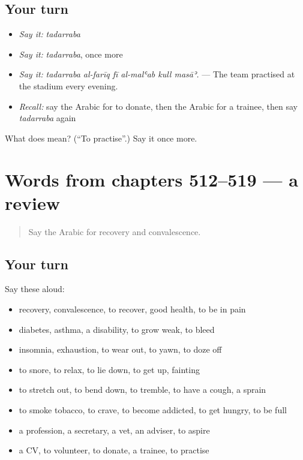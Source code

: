 \subsection*{Your turn}
\begin{itemize}
\raggedright
  \item \emph{Say it:} \emph{tadarraba}
  \item \emph{Say it:} \emph{tadarraba}, once more
  \item \emph{Say it:} \emph{tadarraba al-farīq fī al-malʿab kull masāʾ.} — The team practised at the stadium every evening.
  \item \emph{Recall:} say the Arabic for to donate, then the Arabic for a trainee, then say \emph{tadarraba} again
\end{itemize}

\begin{tcolorbox}[breakable,colback=teal!4,colframe=teal!35!black,title={Before you move on}]
What does  mean? (\textquotedblleft{}To practise\textquotedblright{}.) Say it once more.
\end{tcolorbox}
\section[(dialogue)]{Words from chapters 512–519 — a review}

\label{lesson:AR-R519-review-512-519}



\begin{quote}
Say the Arabic for recovery and convalescence.
\end{quote}

\subsection*{Your turn}
Say these aloud:

\begin{itemize}
\raggedright
  \item recovery, convalescence, to recover, good health, to be in pain
  \item diabetes, asthma, a disability, to grow weak, to bleed
  \item insomnia, exhaustion, to wear out, to yawn, to doze off
  \item to snore, to relax, to lie down, to get up, fainting
  \item to stretch out, to bend down, to tremble, to have a cough, a sprain
  \item to smoke tobacco, to crave, to become addicted, to get hungry, to be full
  \item a profession, a secretary, a vet, an adviser, to aspire
  \item a CV, to volunteer, to donate, a trainee, to practise
\end{itemize}

